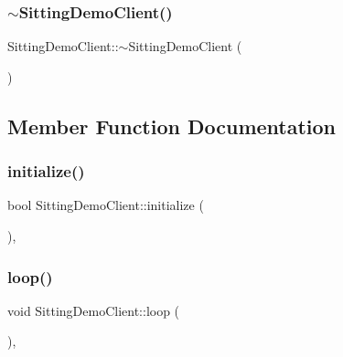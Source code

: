 \subsubsection{\texorpdfstring{$\sim$\+Sitting\+Demo\+Client()}{~SittingDemoClient()}}
{\footnotesize\ttfamily Sitting\+Demo\+Client\+::$\sim$\+Sitting\+Demo\+Client (\begin{DoxyParamCaption}{ }\end{DoxyParamCaption})\hspace{0.3cm}{\ttfamily [virtual]}}



\subsection{Member Function Documentation}
\hypertarget{classSittingDemoClient_aff04405d690f2ae8abbd05ea4b55b64d}{}\label{classSittingDemoClient_aff04405d690f2ae8abbd05ea4b55b64d} 
\subsubsection{\texorpdfstring{initialize()}{initialize()}}
{\footnotesize\ttfamily bool Sitting\+Demo\+Client\+::initialize (\begin{DoxyParamCaption}{ }\end{DoxyParamCaption})\hspace{0.3cm}{\ttfamily [protected]}, {\ttfamily [virtual]}}

\hypertarget{classSittingDemoClient_ad08cf3328c8a4f22a1677b5ad67de645}{}\label{classSittingDemoClient_ad08cf3328c8a4f22a1677b5ad67de645} 
\subsubsection{\texorpdfstring{loop()}{loop()}}
{\footnotesize\ttfamily void Sitting\+Demo\+Client\+::loop (\begin{DoxyParamCaption}{ }\end{DoxyParamCaption})\hspace{0.3cm}{\ttfamily [protected]}, {\ttfamily [virtual]}}

\hypertarget{classSittingDemoClient_a18d30d70a9b17e8f64f87f5cb01b746e}{}\label{classSittingDemoClient_a18d30d70a9b17e8f64f87f5cb01b746e} 
